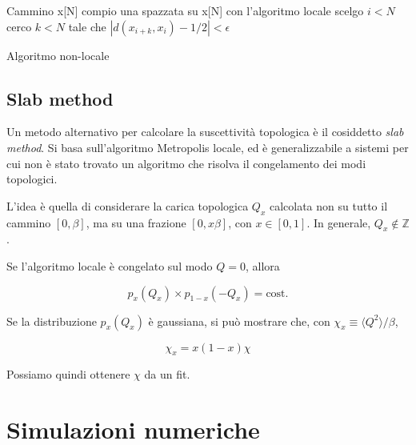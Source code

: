 \documentclass[a4paper,11pt]{article}
\newcommand{\avg}[1]{\langle {#1} \rangle}
\begin{document}
    \begin{algorithm}[H]
    Cammino x[N]\;
    compio una spazzata su x[N] con l'algoritmo locale\;
    scelgo $i < N$\;
    cerco $k < N$ tale che $| d(x_{i+k}, x_i) - 1/2| < \epsilon$\;
    \caption{Algoritmo non-locale}
    \label{alg:tailor}
    \end{algorithm}
    
    \subsection{Slab method}
    
    Un metodo alternativo per calcolare la suscettività topologica è il cosiddetto \emph{slab method}. Si basa sull'algoritmo Metropolis locale, ed è generalizzabile a sistemi per cui non è stato trovato un algoritmo che risolva il congelamento dei modi topologici.
    
    L'idea è quella di considerare la carica topologica $Q_x$ calcolata non su tutto il cammino $[0, \beta]$, ma su una frazione $[0, x\beta]$, con $x \in [0,1]$. In generale, $Q_x \not\in \mathbb{Z}$ .
    
    Se l'algoritmo locale è congelato sul modo $Q = 0$, allora 
    
    \begin{equation}
        p_x (Q_x) \times p_{1-x} (- Q_x) = \text{cost.}
    \end{equation}

    Se la distribuzione $p_x (Q_x)$ è gaussiana, si può mostrare che, con $\chi_x \equiv \avg{Q^2}/\beta$, 
    
    \begin{equation}
        \chi_x = x(1-x) \chi
    \end{equation}

    
    Possiamo quindi ottenere $\chi$ da un fit.
    
    \section{Simulazioni numeriche}
    
\end{document}
